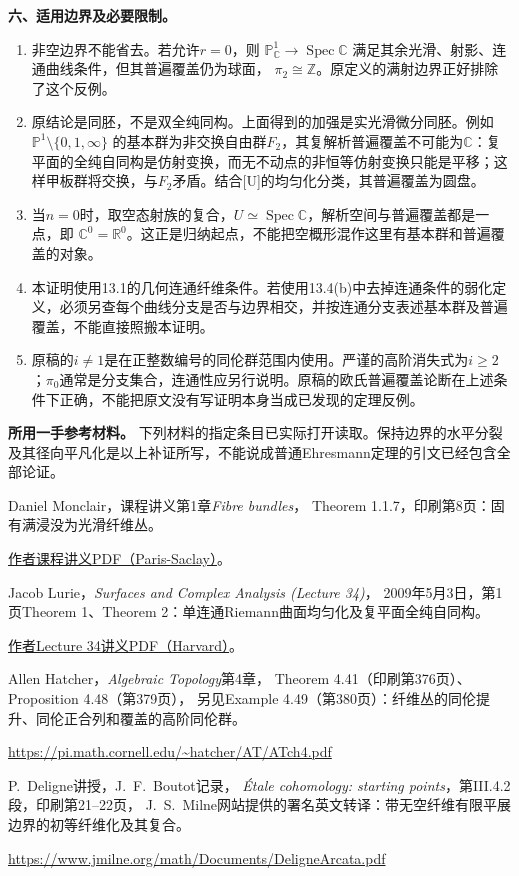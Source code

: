 \documentclass[UTF8,a4paper]{ctexbook}
\DeclareMathOperator{\Spec}{Spec}
\begin{document}
\par\medskip\noindent\textbf{六、适用边界及必要限制。}
\begin{enumerate}[label=\arabic*.]
\item 非空边界不能省去。若允许$r=0$，则
$\mathbb P^1_{\mathbb C}\to\Spec\mathbb C$
满足其余光滑、射影、连通曲线条件，但其普遍覆盖仍为球面，
$\pi_2\cong\mathbb Z$。原定义的满射边界正好排除了这个反例。
\item 原结论是同胚，不是双全纯同构。上面得到的加强是实光滑微分同胚。例如
$\mathbb P^1\setminus\{0,1,\infty\}$
的基本群为非交换自由群$F_2$，其复解析普遍覆盖不可能为$\mathbb C$：复平面的全纯自同构是仿射变换，而无不动点的非恒等仿射变换只能是平移；这样甲板群将交换，与$F_2$矛盾。结合[U]的均匀化分类，其普遍覆盖为圆盘。
\item 当$n=0$时，取空态射族的复合，$U\simeq\Spec\mathbb C$，解析空间与普遍覆盖都是一点，即
$\mathbb C^0=\mathbb R^0$。这正是归纳起点，不能把空概形混作这里有基本群和普遍覆盖的对象。
\item 本证明使用13.1的几何连通纤维条件。若使用13.4(b)中去掉连通条件的弱化定义，必须另查每个曲线分支是否与边界相交，并按连通分支表述基本群及普遍覆盖，不能直接照搬本证明。
\item 原稿的$i\ne1$是在正整数编号的同伦群范围内使用。严谨的高阶消失式为$i\geq2$；$\pi_0$通常是分支集合，连通性应另行说明。原稿的欧氏普遍覆盖论断在上述条件下正确，不能把原文没有写证明本身当成已发现的定理反例。
\end{enumerate}

\par\medskip\noindent\textbf{所用一手参考材料。}
下列材料的指定条目已实际打开读取。保持边界的水平分裂及其径向平凡化是以上补证所写，不能说成普通Ehresmann定理的引文已经包含全部论证。
\begin{description}[style=nextline]
\item[{[E]}] Daniel Monclair，课程讲义第1章\emph{Fibre bundles}，
Theorem 1.1.7，印刷第8页：固有满浸没为光滑纤维丛。
\par\href{https://www.imo.universite-paris-saclay.fr/~daniel.monclair/chap2.pdf}{作者课程讲义PDF（Paris-Saclay）}。
\item[{[U]}] Jacob Lurie，\emph{Surfaces and Complex Analysis (Lecture 34)}，
2009年5月3日，第1页Theorem 1、Theorem 2：单连通Riemann曲面均匀化及复平面全纯自同构。
\par\href{https://people.math.harvard.edu/~lurie/937notes/937Lecture34.pdf}{作者Lecture 34讲义PDF（Harvard）}。
\item[{[H]}] Allen Hatcher，\emph{Algebraic Topology}第4章，
Theorem 4.41（印刷第376页）、Proposition 4.48（第379页），
另见Example 4.49（第380页）：纤维丛的同伦提升、同伦正合列和覆盖的高阶同伦群。
\par\url{https://pi.math.cornell.edu/~hatcher/AT/ATch4.pdf}
\item[{[D]}] P.~Deligne讲授，J.~F.~Boutot记录，
\emph{Étale cohomology: starting points}，第III.4.2段，印刷第21--22页，
J.~S.~Milne网站提供的署名英文转译：带无空纤维有限平展边界的初等纤维化及其复合。
\par\url{https://www.jmilne.org/math/Documents/DeligneArcata.pdf}
\end{description}
\setcounter{secnumdepth}{-2}
\end{document}
